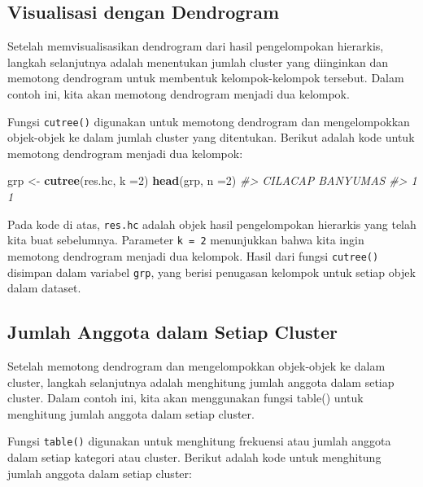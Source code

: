 \documentclass[
  oneside]{book}
\newenvironment{Shaded}{\begin{snugshade}}{\end{snugshade}}
\newcommand{\AttributeTok}[1]{\textcolor[rgb]{0.13,0.29,0.53}{#1}}
\newcommand{\CommentTok}[1]{\textcolor[rgb]{0.56,0.35,0.01}{\textit{#1}}}
\newcommand{\DecValTok}[1]{\textcolor[rgb]{0.00,0.00,0.81}{#1}}
\newcommand{\FunctionTok}[1]{\textcolor[rgb]{0.13,0.29,0.53}{\textbf{#1}}}
\newcommand{\NormalTok}[1]{#1}
\newcommand{\OtherTok}[1]{\textcolor[rgb]{0.56,0.35,0.01}{#1}}
\begin{document}
\subsection*{Visualisasi dengan Dendrogram}\label{visualisasi-dengan-dendrogram-1}

Setelah memvisualisasikan dendrogram dari hasil pengelompokan hierarkis, langkah selanjutnya adalah menentukan jumlah cluster yang diinginkan dan memotong dendrogram untuk membentuk kelompok-kelompok tersebut. Dalam contoh ini, kita akan memotong dendrogram menjadi dua kelompok.

Fungsi \texttt{cutree()} digunakan untuk memotong dendrogram dan mengelompokkan objek-objek ke dalam jumlah cluster yang ditentukan. Berikut adalah kode untuk memotong dendrogram menjadi dua kelompok:

\begin{Shaded}
\begin{Highlighting}[]
\NormalTok{grp }\OtherTok{\textless{}{-}} \FunctionTok{cutree}\NormalTok{(res.hc, }\AttributeTok{k =}\DecValTok{2}\NormalTok{)}
\FunctionTok{head}\NormalTok{(grp, }\AttributeTok{n =}\DecValTok{2}\NormalTok{)}
\CommentTok{\#\textgreater{}  CILACAP BANYUMAS }
\CommentTok{\#\textgreater{}        1        1}
\end{Highlighting}
\end{Shaded}

Pada kode di atas, \texttt{res.hc} adalah objek hasil pengelompokan hierarkis yang telah kita buat sebelumnya. Parameter \texttt{k\ =\ 2} menunjukkan bahwa kita ingin memotong dendrogram menjadi dua kelompok. Hasil dari fungsi \texttt{cutree()} disimpan dalam variabel \texttt{grp}, yang berisi penugasan kelompok untuk setiap objek dalam dataset.

\subsection*{Jumlah Anggota dalam Setiap Cluster}\label{jumlah-anggota-dalam-setiap-cluster}

Setelah memotong dendrogram dan mengelompokkan objek-objek ke dalam cluster, langkah selanjutnya adalah menghitung jumlah anggota dalam setiap cluster. Dalam contoh ini, kita akan menggunakan fungsi table() untuk menghitung jumlah anggota dalam setiap cluster.

Fungsi \texttt{table()} digunakan untuk menghitung frekuensi atau jumlah anggota dalam setiap kategori atau cluster. Berikut adalah kode untuk menghitung jumlah anggota dalam setiap cluster:
\end{document}
